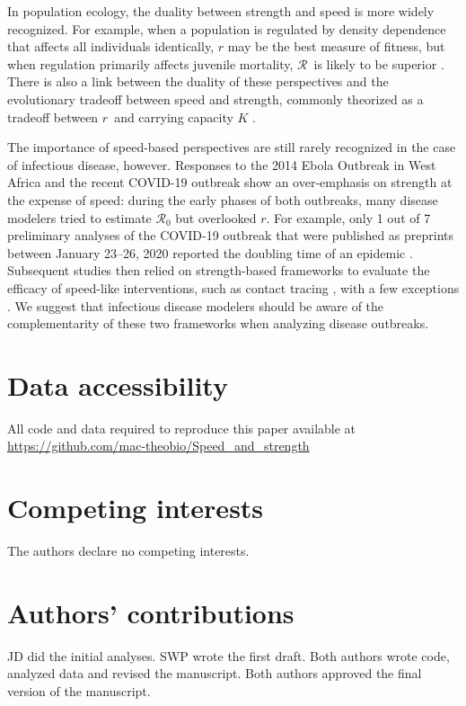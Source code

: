 \documentclass[12pt]{article}
\newcommand{\RR}{\ensuremath{{\mathcal R}}}
\newcommand{\rr}{\ensuremath{{r}}}
\begin{document}
In population ecology, the duality between strength and speed is more widely recognized.
For example, when a population is regulated by density dependence that affects all individuals identically, $r$ may be the best measure of fitness, 
but when regulation primarily affects juvenile mortality, \RR\ is likely to be superior \citep{mylius1995evolutionarily,pasztor1996r0}.
There is also a link between the duality of these perspectives and the evolutionary tradeoff between speed and strength, commonly theorized as a tradeoff between \rr\ and carrying capacity $K$ \cite{Pianka70}.

The importance of speed-based perspectives are still rarely recognized in the case of infectious disease, however. 
Responses to the 2014 Ebola Outbreak in West Africa and the recent COVID-19 outbreak show an over-emphasis on strength at the expense of speed:   
during the early phases of both outbreaks, many disease modelers tried to estimate $\mathcal R_0$ but overlooked $r$.
For example, only 1 out of 7 preliminary analyses of the COVID-19 outbreak that were published as preprints between January 23--26, 2020 reported the doubling time of an epidemic \citep{bedfordncov, imaincov, liuncov, majumderncov, readncov, riouncov, zhaoncov}.
Subsequent studies then relied on strength-based frameworks to evaluate the efficacy of speed-like interventions, such as contact tracing \cite{hellewell2020feasibility,kretzschmar2020impact,kucharski2020contact}, with a few exceptions \cite{ferretti2020quantifying}.
We suggest that infectious disease modelers should be aware of the complementarity of these two frameworks when analyzing disease outbreaks.



\section{Data accessibility}

All code and data required to reproduce this paper available at \url{https://github.com/mac-theobio/Speed_and_strength}

\section{Competing interests}

The authors declare no competing interests.

\section{Authors’ contributions}

JD did the initial analyses. SWP wrote the first draft. Both authors wrote code, analyzed data and revised the manuscript. Both authors approved the final version of the manuscript.
\end{document}
